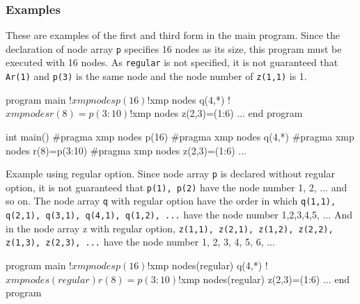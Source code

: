 \subsubsection*{Examples}

These are examples of the first
and third form in the main program. Since the declaration of node
array {\tt p} specifies 16 nodes as its size, this program must be executed
with 16 nodes. As {\tt regular} is not specified, it is not guaranteed that
{\tt Ar(1)} and {\tt p(3)} is the same node and the node number of
{\tt z(1,1)} is 1. 

\vspace{0.5cm}

\begin{minipage}{0.45\hsize}
\begin{center}
\begin{Fexample}
      program main
!$xmp nodes p(16)
!$xmp nodes q(4,*)
!$xmp nodes r(8)=p(3:10)
!$xmp nodes z(2,3)=(1:6)
      ...       
      end program 
\end{Fexample}
\end{center}
\end{minipage}
\begin{minipage}{0.45\hsize}
\begin{center}
\begin{CexampleR}
int main() {
#pragma xmp nodes p(16)
#pragma xmp nodes q(4,*)
#pragma xmp nodes r(8)=p(3:10)
#pragma xmp nodes z(2,3)=(1:6)
    ...
}
\end{CexampleR}
\end{center}
\end{minipage}
\vspace{1cm}

Example using regular option. Since node array {\tt p} is declared
without regular option, it is not guaranteed that {\tt p(1), p(2)}
have the node number 1, 2, ... and so on. The node array {\tt q} with 
regular option have the order in which
{\tt q(1,1), q(2,1), q(3,1), q(4,1), q(1,2), ...} have the node number
1,2,3,4,5, ... And in the node array z with regular option,
{\tt z(1,1), z(2,1), z(1,2), z(2,2), z(1,3), z(2,3), ...} have the
node number 1, 2, 3, 4, 5, 6, ...

\begin{Fexample}
      program main
!$xmp nodes p(16)
!$xmp nodes(regular) q(4,*)
!$xmp nodes(regular) r(8)=p(3:10)
!$xmp nodes(regular) z(2,3)=(1:6)
      ...
      end program
\end{Fexample}

